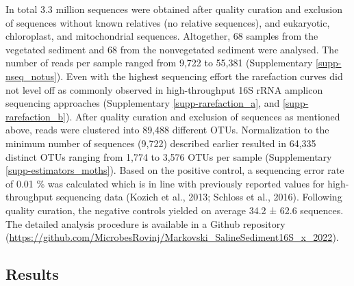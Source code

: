 \documentclass[12pt,]{article}
\begin{document}
In total 3.3 million sequences were obtained after quality curation and
exclusion of sequences without known relatives (no relative sequences),
and eukaryotic, chloroplast, and mitochondrial sequences. Altogether, 68
samples from the vegetated sediment and 68 from the nonvegetated
sediment were analysed. The number of reads per sample ranged from 9,722
to 55,381 (Supplementary \autoref{supp-nseq_notus}). Even with the
highest sequencing effort the rarefaction curves did not level off as
commonly observed in high-throughput 16S rRNA amplicon sequencing
approaches (Supplementary \autoref{supp-rarefaction_a}, and
\ref{supp-rarefaction_b}). After quality curation and exclusion of
sequences as mentioned above, reads were clustered into 89,488 different
OTUs. Normalization to the minimum number of sequences (9,722) described
earlier resulted in 64,335 distinct OTUs ranging from 1,774 to 3,576
OTUs per sample (Supplementary \autoref{supp-estimators_moths}). Based
on the positive control, a sequencing error rate of 0.01 \si{\percent}
was calculated which is in line with previously reported values for
high-throughput sequencing data (Kozich et al., 2013; Schloss et al.,
2016). Following quality curation, the negative controls yielded on
average 34.2 ± 62.6 sequences. The detailed analysis procedure is
available in a Github repository
(\url{https://github.com/MicrobesRovinj/Markovski_SalineSediment16S_x_2022}).

\newpage

\hypertarget{results}{%
\subsection{Results}\label{results}}
\end{document}
